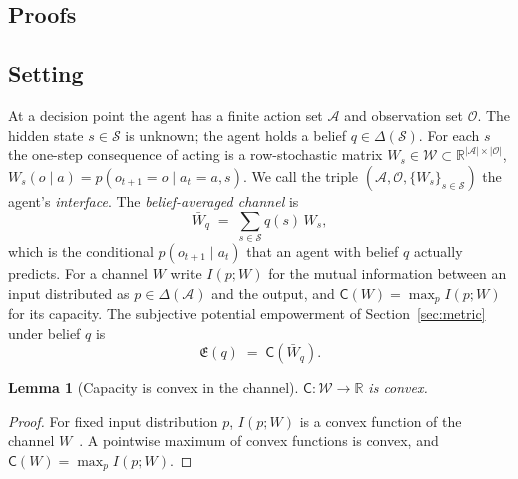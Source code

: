 \documentclass[pdflatex,sn-apa]{sn-jnl}%
\newtheorem{lemma}{Lemma}
\theoremstyle{definition}
\providecommand{\R}{\mathbb{R}}
\providecommand{\cA}{\mathcal{A}}
\providecommand{\cO}{\mathcal{O}}
\providecommand{\cS}{\mathcal{S}}
\providecommand{\cW}{\mathcal{W}}
\providecommand{\Emp}{\mathfrak{E}}
\providecommand{\Capa}{\mathsf{C}}
\begin{document}
\begin{appendices}

\section{Proofs}\label{app:proofs}

\subsection*{Setting}
At a decision point the agent has a finite action set $\cA$ and observation set $\cO$. The hidden state $s \in \cS$ is unknown; the agent holds a belief $q \in \Delta(\cS)$. For each $s$ the one-step consequence of acting is a row-stochastic matrix $W_s \in \cW \subset \R^{|\cA| \times |\cO|}$, $W_s(o \mid a) = p(o_{t+1} = o \mid a_t = a, s)$. We call the triple $(\cA, \cO, \{W_s\}_{s \in \cS})$ the agent's \emph{interface}. The \emph{belief-averaged channel} is
\begin{equation}
  \bar W_q \;=\; \sum_{s \in \cS} q(s)\, W_s ,
  \label{eq:mixed}
\end{equation}
which is the conditional $p(o_{t+1} \mid a_t)$ that an agent with belief $q$ actually predicts. For a channel $W$ write $I(p; W)$ for the mutual information between an input distributed as $p \in \Delta(\cA)$ and the output, and $\Capa(W) = \max_{p} I(p; W)$ for its capacity. The subjective potential empowerment of Section~\ref{sec:metric} under belief $q$ is
\begin{equation}
  \Emp(q) \;=\; \Capa(\bar W_q).
  \label{eq:emp}
\end{equation}

\begin{lemma}[Capacity is convex in the channel]
\label{lem:convex}
$\Capa : \cW \to \R$ is convex.
\end{lemma}
\begin{proof}
For fixed input distribution $p$, $I(p; W)$ is a convex function of the channel $W$~\citep[Theorem~2.7.4]{coverElementsInformationTheory2006}. A pointwise maximum of convex functions is convex, and $\Capa(W) = \max_p I(p; W)$.
\end{proof}


\end{appendices}
\end{document}
